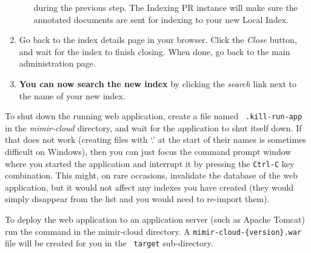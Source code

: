 \begin{enumerate}
\begin{enumerate}
    during the previous step. The \Mimir{} Indexing PR instance will make
    sure the annotated documents are sent for indexing to your new Local Index.
  \end{enumerate}
  \item Go back to the index details page in your browser. Click the {\em Close}
  button, and wait for the index to finish closing. When done, go back to the
  main administration page. 
  \item {\bf You can now search the new index} by clicking the {\em search} link
  next to the name of your new index.
\end{enumerate}

To shut down the running web application, create a file named {\tt
.kill-run-app} in the {\em mimir-cloud} directory, and wait for the application
to shut itself down. If that does not work (creating files with `.' at the start
of their names is sometimes difficult on Windows), then you can just focus the
command prompt window where you started the application and interrupt it by
pressing the {\tt Ctrl-C} key combination. This might, on rare occasions,
invalidate the database of the \Mimir{} web application, but it would not affect
any indexes you have created (they would simply disappear from the list and
you would need to re-import them).

To deploy the \Mimir{} web application to an application server (such as Apache
Tomcat) run the  command in the mimir-cloud directory. A
{\tt mimir-cloud-\{version\}.war} file will be created for you in the {\tt
target} sub-directory.